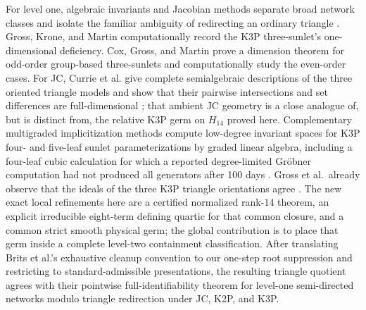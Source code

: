 For level one, algebraic invariants and Jacobian methods separate broad
network classes and isolate the familiar ambiguity of redirecting an
ordinary triangle
\cite{GrossLong2018,HolleringSullivant2021,GrossEtAl2021,
GrossKroneMartin2024,CoxGrossMartin2025,BritsEtAl2026}.  Gross, Krone, and
Martin computationally record the K3P three-sunlet's one-dimensional
deficiency.  Cox, Gross, and Martin prove a dimension theorem for odd-order
group-based three-sunlets and computationally study the even-order cases.
For JC, Currie et al. give complete semialgebraic descriptions of the three
oriented triangle models and show that their pairwise intersections and set
differences are full-dimensional \cite{CurrieEtAl2026}; that ambient JC
geometry is a close analogue of, but is distinct from, the relative K3P
germ on \(H_{14}\) proved here.
Complementary multigraded implicitization methods compute low-degree
invariant spaces for K3P four- and five-leaf sunlet parameterizations by
graded linear algebra, including a four-leaf cubic calculation for which a
reported degree-limited Gr\"obner computation had not produced all generators
after 100 days \cite{CummingsHollering2026}.  Gross et al.~already observe
that the ideals of the three K3P triangle orientations agree
\cite{GrossEtAl2021}.  The new exact local refinements here are a certified
normalized rank-\(14\) theorem, an explicit irreducible eight-term defining
quartic for that common closure, and a common strict smooth physical germ;
the global contribution is to place that germ inside a complete level-two
containment classification.  After translating Brits et al.'s exhaustive
cleanup convention to our one-step root suppression and restricting to
standard-admissible presentations, the resulting triangle quotient agrees
with their pointwise full-identifiability theorem for level-one semi-directed
networks modulo triangle redirection under JC, K2P, and K3P.

